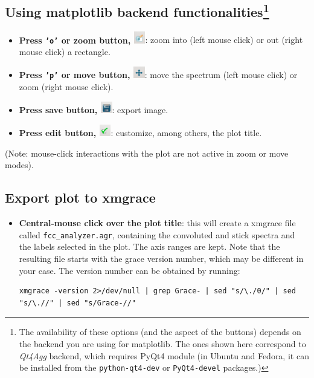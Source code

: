 \documentclass[a4paper,11pt]{article}
\begin{document}
\subsection{Using matplotlib backend functionalities\footnote{The availability of these options (and the aspect of the buttons) depends on the backend you are using for matplotlib. The ones shown here correspond to \textit{Qt4Agg} backend, which requires PyQt4 module (in Ubuntu and Fedora, it can be installed from the \texttt{python-qt4-dev} or \texttt{PyQt4-devel} packages.)}}
\begin{itemize}
 \item \textbf{Press \texttt{'o'} or zoom button, \includegraphics[width=0.5cm]{figs/butt_zoom.jpg}}: zoom into (left mouse click) or out (right mouse click) a rectangle.
 \item \textbf{Press \texttt{'p'} or move button, \includegraphics[width=0.5cm]{figs/butt_move.jpg}}: move the spectrum (left mouse click) or zoom (right mouse click).
 \item \textbf{Press save button, \includegraphics[width=0.5cm]{figs/butt_save.jpg}}: export image.
 \item \textbf{Press edit button, \includegraphics[width=0.5cm]{figs/butt_edit.jpg}}: customize, among others, the plot title.
\end{itemize}
(Note: mouse-click interactions with the plot are not active in zoom or move modes).

\subsection{Export plot to xmgrace}
\begin{itemize}
 \item \textbf{Central-mouse click over the plot title}: this will create a xmgrace file called \texttt{fcc\_analyzer.agr}, containing the convoluted and stick spectra and the labels selected in the plot. The axis ranges are kept. Note that the resulting file starts with the grace version number, which may be different in your case. The version number can be obtained by running:

\begin{minipage}{1.0\textwidth}
 \begin{lstlisting}[label=get_graceversion,caption=Getting \texttt{grace} version]
xmgrace -version 2>/dev/null | grep Grace- | sed "s/\./0/" | sed "s/\.//" | sed "s/Grace-//"
 \end{lstlisting}
\end{minipage}

\end{itemize}
\end{document}
